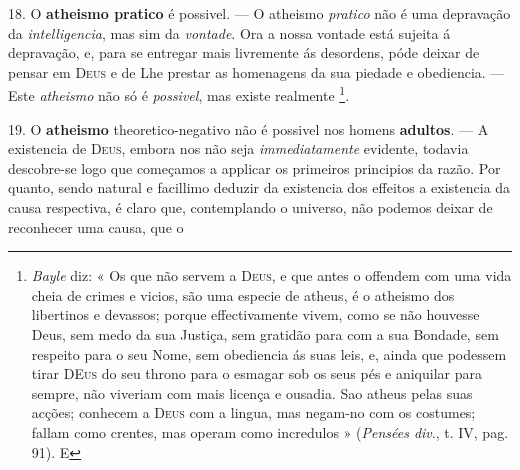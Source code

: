  18. O \textbf{atheismo pratico} é possivel. --- O atheismo \emph{pratico} não é uma depravação da \emph{intelligencia}, mas sim da \emph{vontade}. Ora a nossa vontade está sujeita á depravação, e, para se entregar mais livremente ás desordens, póde deixar de pensar em \textsc{Deus} e de Lhe prestar as homenagens da sua piedade e obediencia. --- Este \emph{atheismo} não só é \emph{possivel}, mas existe realmente \footnote{\emph{Bayle} diz: « Os que não servem a \textsc{Deus}, e que antes o offendem com uma vida cheia de crimes e vicios, são uma especie de atheus, é o atheismo dos libertinos e devassos; porque effectivamente vivem, como se não houvesse Deus, sem medo da sua Justiça, sem gratidão para com a sua Bondade, sem respeito para o seu Nome, sem obediencia ás suas leis, e, ainda que podessem tirar \textsc{DEus} do seu throno para o esmagar sob os seus pés e aniquilar para sempre, não viveriam com mais licença e ousadia. Sao atheus pelas suas acções; conhecem a \textsc{Deus} com a lingua, mas negam-no com os costumes; fallam como crentes, mas operam como incredulos » (\emph{Pensées div}., t. IV, pag. 91). E}.

19. O \textbf{atheismo} theoretico-negativo não é possivel nos homens \textbf{adultos}. --- A existencia de \textsc{Deus}, embora nos não seja \emph{immediatamente} evidente, todavia descobre-se logo que começamos a applicar os primeiros principios da razão. Por quanto, sendo natural e facillimo deduzir da existencia dos effeitos a existencia da causa respectiva, é claro que, contemplando o universo, não podemos deixar de reconhecer uma causa, que o 